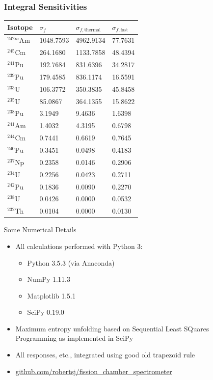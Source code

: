 \documentclass[fleqn]{beamer}
\begin{document}
    \begin{frame}
       \frametitle{Integral Sensitivities}
    
    \small
        \begin{table}
            \begin{tabular}{llll}
                \toprule
                Isotope & $\sigma_f$ & $\sigma_{f,\text{thermal}}$ & $\sigma_{f, \text{fast}}$ \\ 
                \hline
 ${}^{242m}$Am & 1048.7593 &  4962.9134 &  77.7631\\
 ${}^{245}$Cm & 264.1680 &  1133.7858 &  48.4394\\
 \hline
 ${}^{241}$Pu & 192.7684 &  831.6396 &  34.2817\\
 ${}^{239}$Pu & 179.4585 &  836.1174 &  16.5591\\
 ${}^{233}$U & 106.3772 &  350.3835 &  45.8458\\
 ${}^{235}$U & 85.0867 &  364.1355 &  15.8622\\
 \hline
 ${}^{238}$Pu & 3.1949 &  9.4636 &  1.6398\\
 ${}^{241}$Am & 1.4032 &  4.3195 &  0.6798\\
 ${}^{244}$Cm & 0.7441 &  0.6619 &  0.7645\\
 \hline
 ${}^{240}$Pu & 0.3451 &  0.0498 &  0.4183\\
 ${}^{237}$Np & 0.2358 &  0.0146 &  0.2906\\
 ${}^{234}$U & 0.2256 &  0.0423 &  0.2711\\
 ${}^{242}$Pu & 0.1836 &  0.0090 &  0.2270\\
 \hline
 ${}^{238}$U & 0.0426 &  0.0000 &  0.0532\\
 ${}^{232}$Th & 0.0104 &  0.0000 &  0.0130\\
                \bottomrule
            \end{tabular}
        \end{table}
        
    \end{frame}
    
    \begin{frame}{Some Numerical Details}
     \begin{itemize}
      \item All calculations performed with Python 3:
        \begin{itemize}
          \item Python 3.5.3 (via Anaconda)
          \item NumPy 1.11.3
          \item Matplotlib 1.5.1
          \item SciPy 0.19.0
        \end{itemize}
      \item Maximum entropy unfolding based on Sequential Least SQuares Programming
            as implemented in SciPy
      \item All responses, etc., integrated using good old trapezoid rule 
      \item \url{github.com/robertsj/fission_chamber_spectrometer}
     \end{itemize}
     

    \end{frame}
\end{document}
